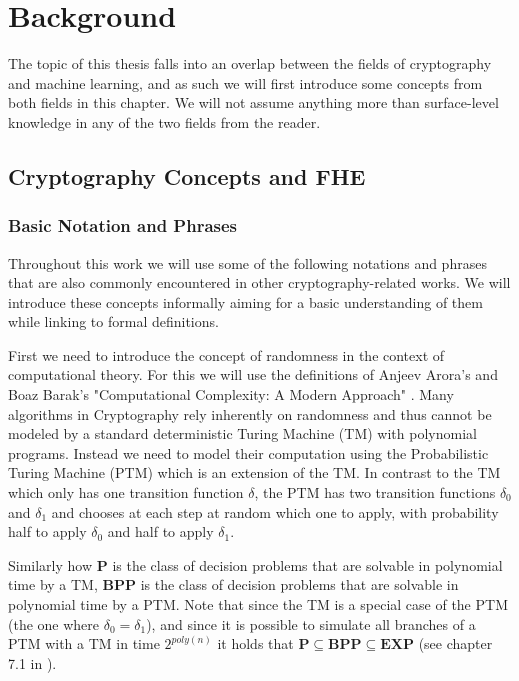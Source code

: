 \chapter{Background}

The topic of this thesis falls into an overlap between the fields of cryptography and machine learning, and as such we will first introduce some concepts from both fields in this chapter. We will not assume anything more than surface-level knowledge in any of the two fields from the reader.

\section{Cryptography Concepts and FHE}

\subsection{Basic Notation and Phrases}

Throughout this work we will use some of the following notations and phrases that are also commonly encountered in other cryptography-related works. We will introduce these concepts informally aiming for a basic understanding of them while linking to formal definitions.

First we need to introduce the concept of randomness in the context of computational theory. For this we will use the definitions of Anjeev Arora's and Boaz Barak's "Computational Complexity: A Modern Approach" \cite{arora_computational_2009}. Many algorithms in Cryptography rely inherently on randomness and thus cannot be modeled by a standard deterministic Turing Machine (TM) with polynomial programs. Instead we need to model their computation using the Probabilistic Turing Machine (PTM) which is an extension of the TM. In contrast to the TM which only has one transition function $\delta$, the PTM has two transition functions $\delta_0$ and $\delta_1$ and chooses at each step at random which one to apply, with probability half to apply $\delta_0$ and half to apply $\delta_1$.

Similarly how $\mathbf{P}$ is the class of decision problems that are solvable in polynomial time by a TM, $\mathbf{BPP}$ is the class of decision problems that are solvable in polynomial time by a PTM. Note that since the TM is a special case of the PTM (the one where $\delta_0 = \delta_1$), and since it is possible to simulate all branches of a PTM with a TM in time $2^{poly(n)}$ it holds that $\mathbf{P} \subseteq \mathbf{BPP} \subseteq \mathbf{EXP}$ (see chapter 7.1 in \cite{arora_computational_2009}).

